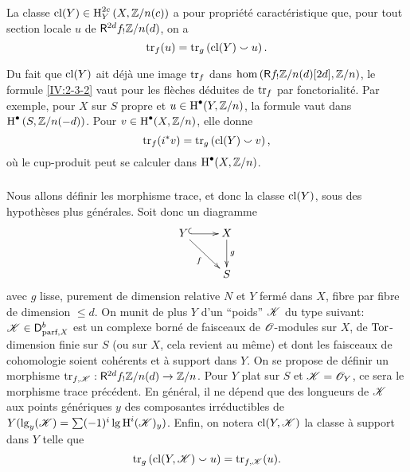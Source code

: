 \begin{definition}\label{IV:2-3-2}
La classe $\operatorname{cl}(Y)\in\operatorname{H}_Y^{2 c}\left(X,\mathbb{Z}/n(c)\right)$ a pour propri\'et\'e 
caract\'eristique que, pour tout section locale $u$ de $\mathsf{R}^{2 d}f_! \mathbb{Z}/n(d)$, 
on a 
\[
  \operatorname{tr}_f(u) = \operatorname{tr}_g\left(\operatorname{cl}(Y)\smallsmile u\right) \text{.}
\]
\end{definition}

Du fait que $\operatorname{cl}(Y)$ ait d\'ej\`a une image $\operatorname{tr}_f$ dans 
$\hom\left(\mathsf{R} f_!\mathbb{Z}/n(d)[2 d],\mathbb{Z}/n\right)$, le formule \ref{IV:2-3-2} vaut 
pour les fl\`eches d\'eduites de $\operatorname{tr}_f$ par fonctorialit\'e. Par exemple, 
pour $X$ sur $S$ propre et $u\in \operatorname{H}^\bullet(Y,\mathbb{Z}/n)$, la formule vaut dans 
$\operatorname{H}^\bullet\left(S,\mathbb{Z}/n(-d)\right)$. Pour $v\in \operatorname{H}^\bullet(X,\mathbb{Z}/n)$, elle 
donne 
\[
  \operatorname{tr}_f(i^* v) = \operatorname{tr}_g\left(\operatorname{cl}(Y)\smallsmile v\right) \text{,}
\]
o\`u le cup-produit peut se calculer dans $\operatorname{H}^\bullet(X,\mathbb{Z}/n)$. 





\subsubsection{}\label{IV:2-3-3}

Nous allons d\'efinir les morphisme trace, et donc la classe $\operatorname{cl}(Y)$, sous des 
hypoth\`eses plus g\'en\'erales. Soit donc un diagramme 
\[\xymatrix{
  Y \ar@{^{(}->}[r] \ar[dr]_-f 
    & X \ar[d]^-g \\
  & S
}\]
avec $g$ lisse, purement de dimension relative $N$ et $Y$ ferm\'e dans $X$, 
fibre par fibre de dimension $\leqslant d$. On munit de plus $Y$ d'un 
``poids'' $\mathscr{K}$ du type suivant: $\mathscr{K}\in\mathsf{D}_{\text{parf},X}^b$ est un 
complexe born\'e de faisceaux de $\mathscr{O}$-modules sur $X$, de $\operatorname{Tor}$-dimension 
finie sur $S$ (ou sur $X$, cela revient au m\^eme) et dont les faisceaux de 
cohomologie soient coh\'erents et \`a support dans $Y$. On se propose de 
d\'efinir un morphisme $\operatorname{tr}_{f,\mathscr{K}}:\mathsf{R}^{2 d}f_! \mathbb{Z}/n(d) \to \mathbb{Z}/n$. Pour $Y$ 
plat sur $S$ et $\mathscr{K}=\mathscr{O}_Y$, ce sera le morphisme trace pr\'ec\'edent. En 
g\'en\'eral, il ne d\'epend que des longueurs de $\mathscr{K}$ aux points 
g\'en\'eriques $y$ des composantes irr\'eductibles de 
$Y(\operatorname{lg}_y(\mathscr{K}) = \sum (-1)^i \operatorname{lg} \operatorname{H}^i(\mathscr{K})_y)$. 
Enfin, on notera $\operatorname{cl}(Y,\mathscr{K})$ la classe \`a support dans $Y$ telle que 
\begin{equation}\label{IV:eq:2-3-3-1}
  \operatorname{tr}_g\left(\operatorname{cl}(Y,\mathscr{K})\smallsmile u\right) = \operatorname{tr}_{f,\mathscr{K}}(u) \text{.}
\end{equation}





